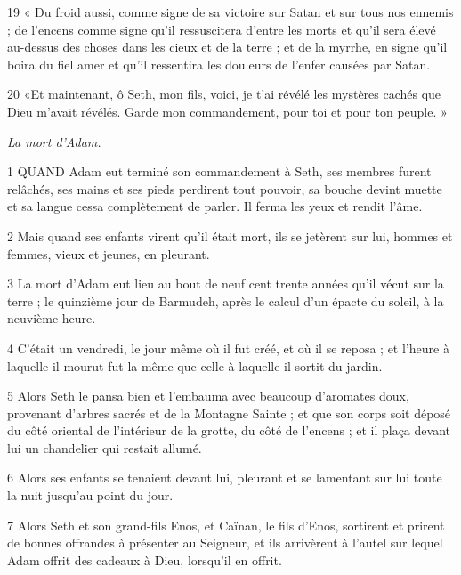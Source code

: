 \par 19 « Du froid aussi, comme signe de sa victoire sur Satan et sur tous nos ennemis ; de l'encens comme signe qu'il ressuscitera d'entre les morts et qu'il sera élevé au-dessus des choses dans les cieux et de la terre ; et de la myrrhe, en signe qu'il boira du fiel amer et qu'il ressentira les douleurs de l'enfer causées par Satan.

\par 20 «Et maintenant, ô Seth, mon fils, voici, je t'ai révélé les mystères cachés que Dieu m'avait révélés. Garde mon commandement, pour toi et pour ton peuple. »


\par \textit{La mort d'Adam.}

\par 1 QUAND Adam eut terminé son commandement à Seth, ses membres furent relâchés, ses mains et ses pieds perdirent tout pouvoir, sa bouche devint muette et sa langue cessa complètement de parler. Il ferma les yeux et rendit l'âme.

\par 2 Mais quand ses enfants virent qu'il était mort, ils se jetèrent sur lui, hommes et femmes, vieux et jeunes, en pleurant.

\par 3 La mort d'Adam eut lieu au bout de neuf cent trente années qu'il vécut sur la terre ; le quinzième jour de Barmudeh, après le calcul d'un épacte du soleil, à la neuvième heure.

\par 4 C'était un vendredi, le jour même où il fut créé, et où il se reposa ; et l'heure à laquelle il mourut fut la même que celle à laquelle il sortit du jardin.

\par 5 Alors Seth le pansa bien et l'embauma avec beaucoup d'aromates doux, provenant d'arbres sacrés et de la Montagne Sainte ; et que son corps soit déposé du côté oriental de l'intérieur de la grotte, du côté de l'encens ; et il plaça devant lui un chandelier qui restait allumé.

\par 6 Alors ses enfants se tenaient devant lui, pleurant et se lamentant sur lui toute la nuit jusqu'au point du jour.

\par 7 Alors Seth et son grand-fils Enos, et Caïnan, le fils d'Enos, sortirent et prirent de bonnes offrandes à présenter au Seigneur, et ils arrivèrent à l'autel sur lequel Adam offrit des cadeaux à Dieu, lorsqu'il en offrit.

